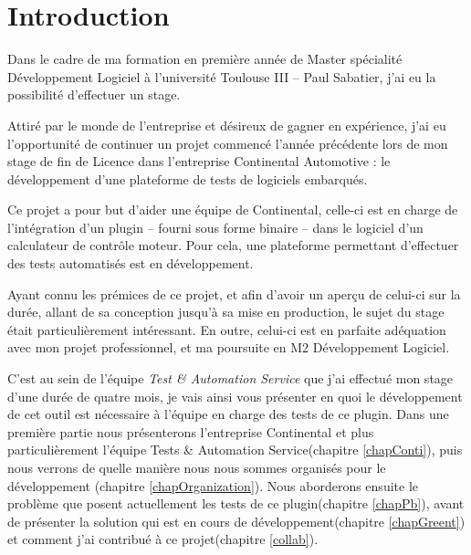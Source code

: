 \chapter*{Introduction}
Dans le cadre de ma formation en première année de Master spécialité Développement Logiciel à l'université Toulouse III – Paul Sabatier, j'ai eu la possibilité d'effectuer un stage.


Attiré par le monde de l'entreprise et désireux de gagner en expérience, j'ai eu l'opportunité de continuer un projet commencé l'année précédente lors de mon stage de fin de Licence dans l'entreprise Continental Automotive : le développement d'une plateforme de tests de logiciels embarqués.

Ce projet a pour but d'aider une équipe de Continental, celle-ci est en charge de l'intégration d'un plugin -- fourni sous forme binaire -- dans le logiciel d'un calculateur de contrôle moteur. Pour cela, une plateforme permettant d'effectuer des tests automatisés est en développement.

Ayant connu les prémices de ce projet, et afin d'avoir un aperçu de celui-ci sur la durée, allant de sa conception jusqu'à sa mise en production, le sujet du stage était particulièrement intéressant. En outre, celui-ci est en parfaite adéquation avec mon projet professionnel, et ma poursuite en M2 Développement Logiciel.

C'est au sein de l'équipe \textit{Test \& Automation Service} que j'ai effectué mon stage d'une durée de quatre mois, je vais ainsi vous présenter en quoi le développement de cet outil est nécessaire à l'équipe en charge des tests de ce plugin. Dans une première partie nous présenterons l'entreprise Continental et plus particulièrement l'équipe Tests \& Automation Service(chapitre \ref{chapConti}), puis nous verrons de quelle manière nous nous sommes organisés pour le développement (chapitre \ref{chapOrganization}). Nous aborderons ensuite le problème que posent actuellement les tests de ce plugin(chapitre \ref{chapPb}), avant de présenter la solution qui est en cours de développement(chapitre \ref{chapGreent}) et comment j'ai contribué à ce projet(chapitre \ref{collab}). 

